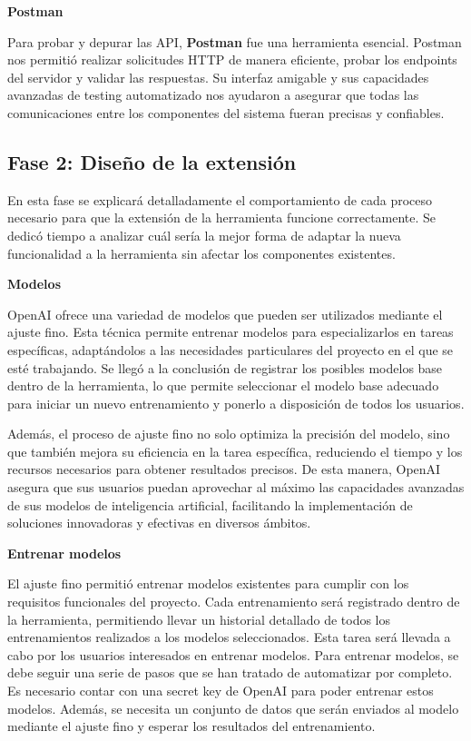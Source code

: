 \textbf{Postman}

Para probar y depurar las API, \textbf{Postman} fue una herramienta esencial. Postman nos permitió realizar solicitudes HTTP de manera eficiente, probar los endpoints del servidor y validar las respuestas. Su interfaz amigable y sus capacidades avanzadas de testing automatizado nos ayudaron a asegurar que todas las comunicaciones entre los componentes del sistema fueran precisas y confiables.


\subsection{Fase 2: Diseño de la extensión}

En esta fase se explicará detalladamente el comportamiento de cada proceso necesario para que la extensión de la herramienta funcione correctamente. Se dedicó tiempo a analizar cuál sería la mejor forma de adaptar la nueva funcionalidad a la herramienta sin afectar los componentes existentes.

\textbf{Modelos}

OpenAI ofrece una variedad de modelos que pueden ser utilizados mediante el ajuste fino. Esta técnica permite entrenar modelos para especializarlos en tareas específicas, adaptándolos a las necesidades particulares del proyecto en el que se esté trabajando. Se llegó a la conclusión de registrar los posibles modelos base dentro de la herramienta, lo que permite seleccionar el modelo base adecuado para iniciar un nuevo entrenamiento y ponerlo a disposición de todos los usuarios.

Además, el proceso de ajuste fino no solo optimiza la precisión del modelo, sino que también mejora su eficiencia en la tarea específica, reduciendo el tiempo y los recursos necesarios para obtener resultados precisos. De esta manera, OpenAI asegura que sus usuarios puedan aprovechar al máximo las capacidades avanzadas de sus modelos de inteligencia artificial, facilitando la implementación de soluciones innovadoras y efectivas en diversos ámbitos.

\textbf{Entrenar modelos}

El ajuste fino permitió entrenar modelos existentes para cumplir con los requisitos funcionales del proyecto. Cada entrenamiento será registrado dentro de la herramienta, permitiendo llevar un historial detallado de todos los entrenamientos realizados a los modelos seleccionados. Esta tarea será llevada a cabo por los usuarios interesados en entrenar modelos. Para entrenar modelos, se debe seguir una serie de pasos que se han tratado de automatizar por completo. Es necesario contar con una secret key de OpenAI para poder entrenar estos modelos. Además, se necesita un conjunto de datos que serán enviados al modelo mediante el ajuste fino y esperar los resultados del entrenamiento.

